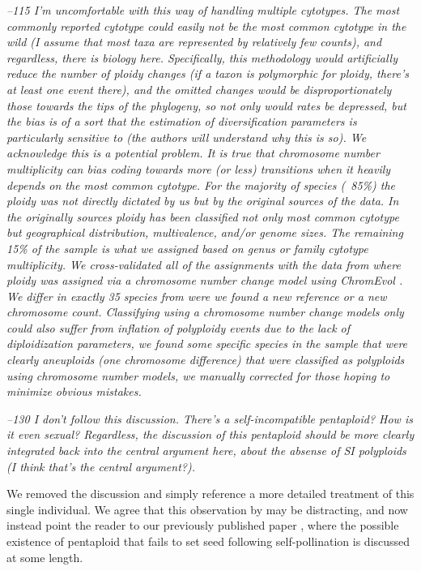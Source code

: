 \documentclass[11pt]{article}
\renewenvironment{quote}{\bigskip\noindent\itshape\ignorespaces}{\smallskip}
\begin{document}
\begin{quote}
--115 I'm uncomfortable with this way of handling multiple cytotypes.
The most commonly reported cytotype could easily not be the most common cytotype in the wild (I assume that most taxa are represented by relatively few counts), and regardless, there is biology here.
Specifically, this methodology would artificially reduce the number of ploidy changes (if a taxon is polymorphic for ploidy, there's at least one event there), and the omitted changes would be disproportionately those towards the tips of the phylogeny, so not only would rates be depressed, but the bias is of a sort that the estimation of diversification parameters is particularly sensitive to (the authors will understand why this is so).
\end{quote}
We acknowledge this is a potential problem. It is true that chromosome number multiplicity can bias coding towards more (or less) transitions when it heavily depends on the most common cytotype. For the majority of species (~85\%)  the ploidy was not directly dictated by us but by the original sources of the data. In the originally sources ploidy has been classified not only most common cytotype but geographical distribution, multivalence, and/or  genome sizes. The remaining 15\% of the sample is what we assigned based on genus or family cytotype multiplicity. We cross-validated all of the assignments with the data from \citet{robertson_2011} where ploidy was assigned via a chromosome number change model using ChromEvol \citep{mayrose_2010}. We differ in exactly 35 species from \citet{robertson_2011} were we found a new reference or a new chromosome count. Classifying using a chromosome number change models only could also suffer from inflation of polyploidy events due to the lack of diploidization parameters, we found some specific species in the  \citet{robertson_2011} sample that were clearly aneuploids (one chromosome difference) that were classified as polyploids using chromosome number models, we manually corrected for those hoping to minimize obvious mistakes.

\begin{quote}
--130 I don't follow this discussion.
There's a self-incompatible pentaploid?
How is it even sexual?
Regardless, the discussion of this pentaploid should be more clearly integrated back into the central argument here, about the absense of SI polyploids (I think that's the central argument?).
\end{quote}

We removed the discussion and simply reference a more detailed treatment of this single individual.
We agree that this observation by \citet{camadro_1981} may be distracting, and now instead  point the reader to our previously published paper \citep{robertson_2011}, where the possible existence of pentaploid that fails to set seed following self-pollination is discussed at some length.
\end{document}
